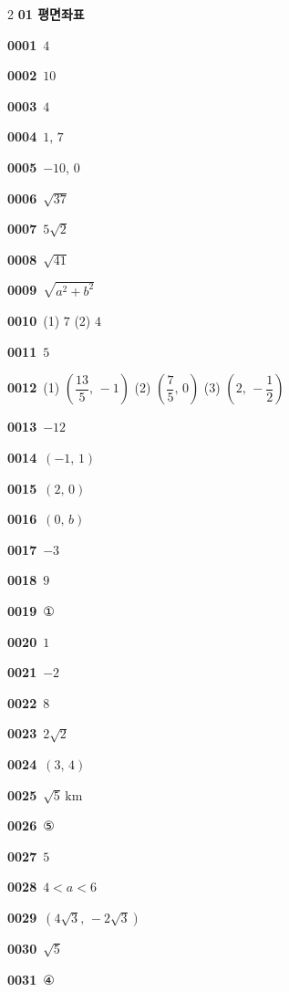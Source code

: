 \documentclass[10pt,a4paper]{article}
\begin{document}
\begin{multicols}{2}\small
\noindent\textbf{01 평면좌표}\par\smallskip
\noindent\textbf{0001}\ $4$\par
\noindent\textbf{0002}\ $10$\par
\noindent\textbf{0003}\ $4$\par
\noindent\textbf{0004}\ $1$, $7$\par
\noindent\textbf{0005}\ $-10$, $0$\par
\noindent\textbf{0006}\ $\sqrt{37}$\par
\noindent\textbf{0007}\ $5\sqrt{2}$\par
\noindent\textbf{0008}\ $\sqrt{41}$\par
\noindent\textbf{0009}\ $\sqrt{a^2+b^2}$\par
\noindent\textbf{0010}\ (1) $7$ \quad (2) $4$\par
\noindent\textbf{0011}\ $5$\par
\noindent\textbf{0012}\ (1) $\left(\dfrac{13}{5},\,-1\right)$ \quad (2) $\left(\dfrac{7}{5},\,0\right)$ \quad (3) $\left(2,\,-\dfrac{1}{2}\right)$\par
\noindent\textbf{0013}\ $-12$\par
\noindent\textbf{0014}\ $(-1,\,1)$\par
\noindent\textbf{0015}\ $(2,\,0)$\par
\noindent\textbf{0016}\ $(0,\,b)$\par
\noindent\textbf{0017}\ $-3$\par
\noindent\textbf{0018}\ $9$\par
\noindent\textbf{0019}\ ①\par
\noindent\textbf{0020}\ $1$\par
\noindent\textbf{0021}\ $-2$\par
\noindent\textbf{0022}\ $8$\par
\noindent\textbf{0023}\ $2\sqrt{2}$\par
\noindent\textbf{0024}\ $(3,\,4)$\par
\noindent\textbf{0025}\ $\sqrt{5}\,\mathrm{km}$\par
\noindent\textbf{0026}\ ⑤\par
\noindent\textbf{0027}\ $5$\par
\noindent\textbf{0028}\ $4<a<6$\par
\noindent\textbf{0029}\ $(4\sqrt{3},\,-2\sqrt{3})$\par
\noindent\textbf{0030}\ $\sqrt{5}$\par
\noindent\textbf{0031}\ ④\par

\end{multicols}
\end{document}
